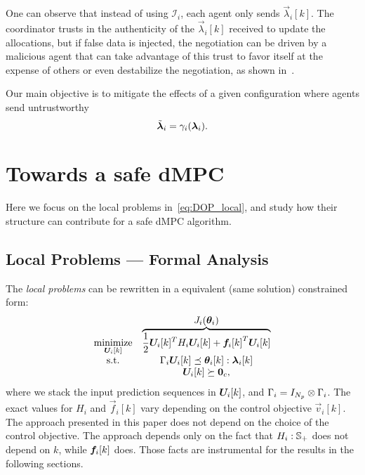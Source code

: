 \documentclass{ifacconf}  %
\begin{document}
One can observe that instead of using $\mathcal{I}_{i}$, each agent only sends $\vec{\lambda}_{i}[k]$. The coordinator trusts in the authenticity of the $\vec{\lambda}_{i}[k]$ received to update the allocations, but if false data is injected, the negotiation can be driven by a malicious agent that can take advantage of this trust to favor itself at the expense of others or even destabilize the negotiation, as shown in~\cite{NogueiraEtAl2021}.

Our main objective is to mitigate the effects of a given configuration where agents send untrustworthy
\begin{equation}\label{eq:cheating}
\tilde{\boldsymbol{\lambda}}_i=\gamma_{i}(\boldsymbol{\lambda}_i).
\end{equation}

\section{Towards a safe dMPC}\label{sec:TSM}

Here we focus on the local problems in~\eqref{eq:DOP_local}, and study how their structure can contribute for a safe dMPC algorithm.

\subsection{Local Problems --- Formal Analysis}\label{ssec:FA}

The \emph{local problems} can be rewritten in a equivalent (same solution) constrained \qp{} form:
\begin{equation}
\begin{matrix}
\underset{\Uik}{\mathrm{minimize}}& \overbrace{\frac{1}{2} \Uik^T H_i\Uik+{\fik}^T\Uik}^{\textstyle J_{i}(\vec{\theta}_{i})}\\
\mathrm{s.t.}&\bar{\Gamma}_{i}\Uik\preceq\vec{\theta}_{i}[k]:\vec{\lambda}_{i}[k]\\
&\Uik\succeq\0_{c},
\end{matrix}
\label{eq:quadratic_case}
\end{equation}
where we stack the input prediction sequences in ${\Uik}$, and
${\relax{\Gamma}_{i}=I_{N_{p}}\mathbin{\otimes}\Gamma_{i}}$.
The exact values for $H_{i}$ and $\vec{f}_{i}[k]$ vary depending on the control objective $\vec{v}_{i}[k]$. The approach presented in this paper does not depend on the choice of the control objective.
The approach depends only on the fact that $H_{i}:\mathbb{S}_{+}$ does not depend on $k$, while $\fik$ does. Those facts are instrumental for the results in the following sections.
\end{document}
